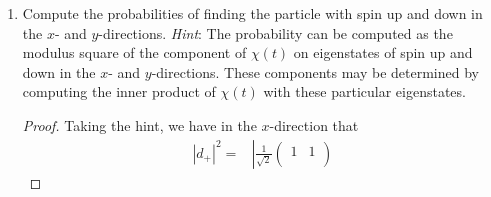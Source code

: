 \documentclass[../psets.tex]{subfiles}
\begin{document}
\begin{enumerate}
\begin{enumerate}
\begin{proof}
\begin{equation*}
\begin{pmatrix}
                    \chi_+\\
                    \chi_-\\
                \end{pmatrix}
            \end{equation*}
            Fortunately, this problem is not that hard to solve. To begin, the above equation splits into the two following ones (technically as components in equal vectors) after a matrix multiplication.
            \begin{align*}
                -\frac{\gamma B\hbar}{2}\chi_+ &= i\hbar\pdv{\chi_+}{t}&
                \frac{\gamma B\hbar}{2}\chi_- &= i\hbar\pdv{\chi_-}{t}
            \end{align*}
            The solutions are then
            \begin{align*}
                \chi_+ &= \chi_+(0)\e[i\gamma Bt/2]&
                \chi_- &= \chi_-(0)\e[-i\gamma Bt/2]
            \end{align*}
            Combining components, the overall solution is
            \begin{equation*}
                \boxed{
                    \chi(t) =
                    \begin{pmatrix}
                        \chi_+(0)\e[i\gamma Bt/2]\\
                        \chi_-(0)\e[-i\gamma Bt/2]\\
                    \end{pmatrix}
                }
            \end{equation*}
        \end{proof}
        \item Compute the probabilities of finding the particle with spin up and down in the $x$- and $y$-directions. \emph{Hint}: The probability can be computed as the modulus square of the component of $\chi(t)$ on eigenstates of spin up and down in the $x$- and $y$-directions. These components may be determined by computing the inner product of $\chi(t)$ with these particular eigenstates.
        \begin{proof}
            Taking the hint, we have in the $x$-direction that
            \begingroup
            \allowdisplaybreaks
            \begin{align*}
                |d_+|^2 ={}& \left|
                    \frac{1}{\sqrt{2}}
                    \begin{pmatrix}
                        1 & 1\\

\end{pmatrix}
\end{align*}
\end{proof}
\end{enumerate}
\end{enumerate}
\end{document}
